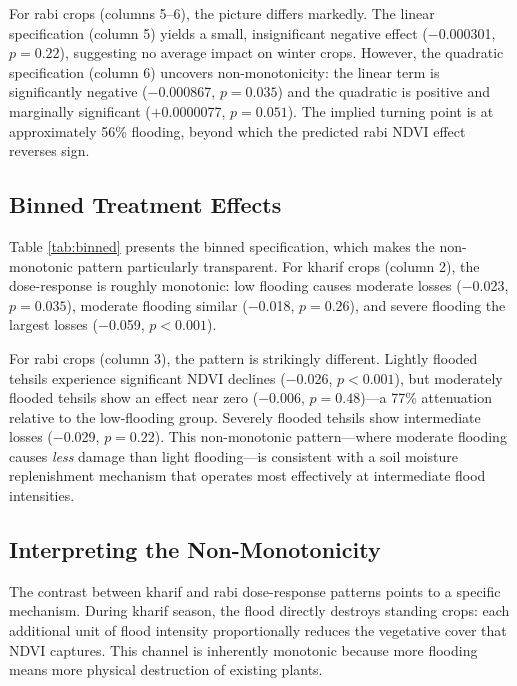 \documentclass[12pt]{article}
\begin{document}
For rabi crops (columns 5--6), the picture differs markedly. The linear specification (column 5) yields a small, insignificant negative effect ($-$0.000301, $p = 0.22$), suggesting no average impact on winter crops. However, the quadratic specification (column 6) uncovers non-monotonicity: the linear term is significantly negative ($-$0.000867, $p = 0.035$) and the quadratic is positive and marginally significant ($+$0.0000077, $p = 0.051$). The implied turning point is at approximately 56\% flooding, beyond which the predicted rabi NDVI effect reverses sign.



\subsection{Binned Treatment Effects}

Table \ref{tab:binned} presents the binned specification, which makes the non-monotonic pattern particularly transparent. For kharif crops (column 2), the dose-response is roughly monotonic: low flooding causes moderate losses ($-$0.023, $p = 0.035$), moderate flooding similar ($-$0.018, $p = 0.26$), and severe flooding the largest losses ($-$0.059, $p < 0.001$).

For rabi crops (column 3), the pattern is strikingly different. Lightly flooded tehsils experience significant NDVI declines ($-$0.026, $p < 0.001$), but moderately flooded tehsils show an effect near zero ($-$0.006, $p = 0.48$)---a 77\% attenuation relative to the low-flooding group. Severely flooded tehsils show intermediate losses ($-$0.029, $p = 0.22$). This non-monotonic pattern---where moderate flooding causes \textit{less} damage than light flooding---is consistent with a soil moisture replenishment mechanism that operates most effectively at intermediate flood intensities.



\subsection{Interpreting the Non-Monotonicity}

The contrast between kharif and rabi dose-response patterns points to a specific mechanism. During kharif season, the flood directly destroys standing crops: each additional unit of flood intensity proportionally reduces the vegetative cover that NDVI captures. This channel is inherently monotonic because more flooding means more physical destruction of existing plants.
\end{document}
